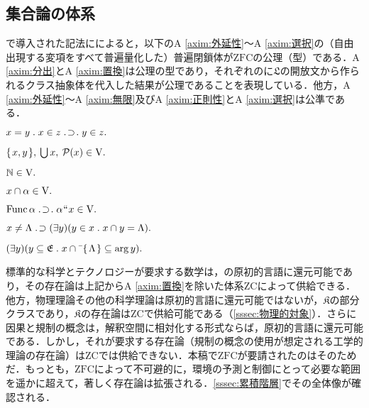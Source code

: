 \subsection{集合論の体系}
\label{ssec:集合論の体系}

で導入された記法にによると，以下のA \ref{axim:外延性}〜A \ref{axim:選択}の（自由出現する変項をすべて普遍量化した）普遍閉鎖体が$\mathrm{ZFC}$の公理（型）である．A \ref{axim:分出}とA \ref{axim:置換}は公理の型であり，それぞれの\kagi{$ \alpha $}に$\mathfrak{L}$の開放文から作られるクラス抽象体を代入した結果が公理であることを表現している．他方，A \ref{axim:外延性}〜A \ref{axim:無限}及びA \ref{axim:正則性}とA \ref{axim:選択}は公準である．

\begin{axim}[外延性]
\label{axim:外延性}
$
    x=y\con{1}x\in z\case{1}{1}{1}y\in z.
$
\end{axim}

\begin{axim}[一対化，和，冪]
\label{axim:一対化，和，冪}
$
    \{\mspace{2mu}x,y\mspace{2mu}\},\:{\textstyle\bigcup}\mspace{3mu}x,\:\mathcal{P}(x)\in\mathrm{V}.
$
\end{axim}

\begin{axim}[無限]
\label{axim:無限}
$
    \mathbb{N}\in\mathrm{V}.
$
\end{axim}

\begin{axim}[分出]
\label{axim:分出}
$
    x\cap\alpha\in\mathrm{V}.
$
\end{axim}

\begin{axim}[置換]
\label{axim:置換}
$
    \func\alpha\case{1}{1}{1}\alpha\img x\in\univ.
$
\end{axim}

\begin{axim}[正則性]
\label{axim:正則性}
$
    x\neq \Lambda {\;.\!}\supset (\exists y)(y\in x{\;.\;}x\cap y=\Lambda).
$
\end{axim}

\begin{axim}[選択]
\label{axim:選択}
$
    (\exists y)(
        y\subseteq\mathfrak{E}\con{1}x\cap\barl{\classab{\Lambda}}\subseteq\arg y
    ).
$
\end{axim}

\noindent 標準的な科学とテクノロジーが要求する数学は，の原初的言語に還元可能であり，その存在論は上記からA \ref{axim:置換}を除いた体系ZCによって供給できる．他方，物理理論その他の科学理論は原初的言語に還元可能ではないが，$\mathfrak{K}$の部分クラスであり，$\mathfrak{K}$の存在論はZCで供給可能である（\ref{sssec:物理的対象}）．さらに因果と規制の概念は，解釈空間に相対化する形式ならば，原初的言語に還元可能である．しかし，それが要求する存在論（規制の概念の使用が想定される工学的理論の存在論）はZCでは供給できない．本稿で$\mathrm{ZFC}$が要請されたのはそのためだ．もっとも，$\mathrm{ZFC}$によって不可避的に，環境の予測と制御にとって必要な範囲を遥かに超えて，著しく存在論は拡張される．\ref{sssec:累積階層}でその全体像が確認される．

